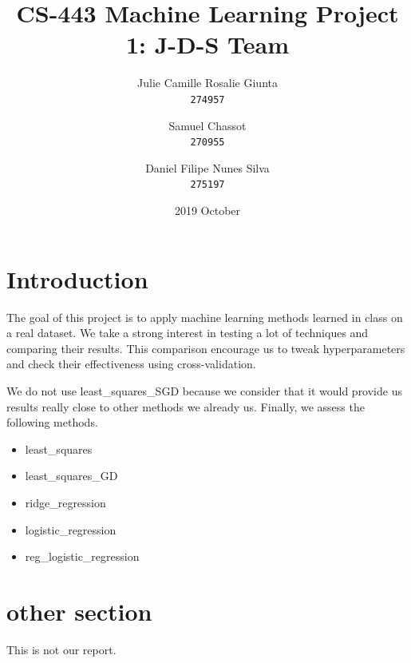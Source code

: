 \documentclass[11pt, a4paper, twoside]{article}
\begin{document}
\date{2019 October}
\title{CS-443 Machine Learning Project 1: J-D-S Team}
\author{
  Julie Camille Rosalie Giunta\\
  \texttt{274957}
  \and
  Samuel Chassot\\
  \texttt{270955}
  \and
  Daniel Filipe Nunes Silva\\
  \texttt{275197}
}

\maketitle
\clearpage

\section{Introduction}
The goal of this project is to apply machine learning
methods learned in class on a real dataset. We take a
strong interest in testing a lot of techniques and
comparing their results. This comparison encourage us to
tweak hyperparameters and check their effectiveness using
cross-validation.

We do not use least\_squares\_SGD because we consider
that it would provide us results really close to other
methods we already us. Finally, we assess the following
methods.

\begin{itemize}
  \item least\_squares
  \item least\_squares\_GD 
  \item ridge\_regression
  \item logistic\_regression
  \item reg\_logistic\_regression
\end{itemize}
 
\section{other section}
This is not our report.
\end{document}
